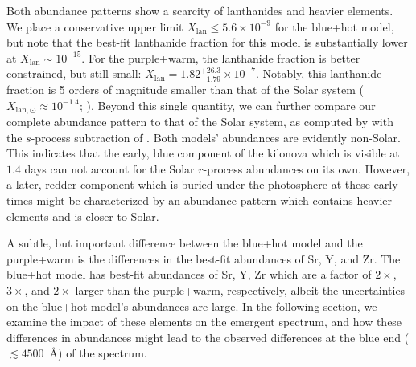 \documentclass[twocolumn, twocolappendix]{aastex63}
\begin{document}
Both abundance patterns show a scarcity of lanthanides and heavier elements. We place a conservative upper limit $X_{\mathrm{lan}} \leqslant 5.6 \times 10^{-9}$ for the blue+hot model, but note that the best-fit lanthanide fraction for this model is substantially lower at $X_{\mathrm{lan}} \sim 10^{-15}$. For the purple+warm, the lanthanide fraction is better constrained, but still small: $X_{\mathrm{lan}} = 1.82^{+26.3}_{-1.79} \times 10^{-7}$. Notably, this lanthanide fraction is 5 orders of magnitude smaller than that of the Solar system ($X_{\mathrm{lan,\odot}} \approx 10^{-1.4}$; \citealt{ji19}). Beyond this single quantity, we can further compare our complete abundance pattern to that of the Solar system, as computed by \cite{lodders09} with the $s$-process subtraction of \cite{bisterzo14}. Both models' abundances are evidently non-Solar. This indicates that the early, blue component of the kilonova which is visible at $1.4$ days can not account for the Solar $r$-process abundances on its own. However, a later, redder component which is buried under the photosphere at these early times might be characterized by an abundance pattern which contains heavier elements and is closer to Solar. 

A subtle, but important difference between the blue+hot model and the purple+warm is the differences in the best-fit abundances of Sr, Y, and Zr. The blue+hot model has best-fit abundances of Sr, Y, Zr which are a factor of $2 \times$, $3 \times$, and $2 \times$ larger than the purple+warm, respectively, albeit the uncertainties on the blue+hot model's abundances are large. In the following section, we examine the impact of these elements on the emergent spectrum, and how these differences in abundances might lead to the observed differences at the blue end ($\lesssim 4500$~\AA) of the spectrum. 
\end{document}
